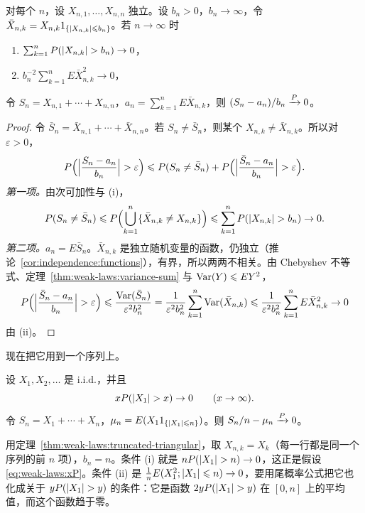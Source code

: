 \begin{theorem}[三角阵列的弱大数定律]\label{thm:weak-laws:truncated-triangular}
对每个 $n$，设 $X_{n,1},\dots,X_{n,n}$ 独立。设 $b_n>0$，$b_n\to\infty$，令 $\bar X_{n,k}=X_{n,k}1_{\{\lvert X_{n,k}\rvert\leqslant b_n\}}$。若 $n\to\infty$ 时
\begin{enumerate}
\item[(i)] $\sum_{k=1}^nP(\lvert X_{n,k}\rvert>b_n)\to0$，
\item[(ii)] $b_n^{-2}\sum_{k=1}^nE\bar X_{n,k}^2\to0$，
\end{enumerate}
令 $S_n=X_{n,1}+\cdots+X_{n,n}$，$a_n=\sum_{k=1}^nE\bar X_{n,k}$，则 $(S_n-a_n)/b_n\xrightarrow{P}0$。
\end{theorem}
\begin{proof}
令 $\bar S_n=\bar X_{n,1}+\cdots+\bar X_{n,n}$。若 $S_n\neq\bar S_n$，则某个 $X_{n,k}\neq\bar X_{n,k}$。所以对 $\varepsilon>0$，
\[
P\Bigl(\Bigl\lvert\frac{S_n-a_n}{b_n}\Bigr\rvert>\varepsilon\Bigr)\leqslant P(S_n\neq\bar S_n)+P\Bigl(\Bigl\lvert\frac{\bar S_n-a_n}{b_n}\Bigr\rvert>\varepsilon\Bigr).
\]
\emph{第一项。}由次可加性与 (i)，
\[
P(S_n\neq\bar S_n)\leqslant P\Bigl(\bigcup_{k=1}^n\{\bar X_{n,k}\neq X_{n,k}\}\Bigr)\leqslant\sum_{k=1}^nP(\lvert X_{n,k}\rvert>b_n)\to0 .
\]
\emph{第二项。}$a_n=E\bar S_n$。$\bar X_{n,k}$ 是独立随机变量的函数，仍独立（推论~\ref{cor:independence:functions}），有界，所以两两不相关。由 Chebyshev 不等式、定理~\ref{thm:weak-laws:variance-sum} 与 $\operatorname{Var}(Y)\leqslant EY^2$，
\[
P\Bigl(\Bigl\lvert\frac{\bar S_n-a_n}{b_n}\Bigr\rvert>\varepsilon\Bigr)\leqslant\frac{\operatorname{Var}(\bar S_n)}{\varepsilon^2b_n^2}=\frac1{\varepsilon^2b_n^2}\sum_{k=1}^n\operatorname{Var}(\bar X_{n,k})\leqslant\frac1{\varepsilon^2b_n^2}\sum_{k=1}^nE\bar X_{n,k}^2\to0
\]
由 (ii)。
\end{proof}

现在把它用到一个序列上。

\begin{theorem}[弱大数定律]\label{thm:weak-laws:wlln}
设 $X_1,X_2,\dots$ 是 i.i.d.，并且
\begin{equation}\label{eq:weak-laws:xP}
xP(\lvert X_1\rvert>x)\to0\qquad(x\to\infty).
\end{equation}
令 $S_n=X_1+\cdots+X_n$，$\mu_n=E(X_11_{\{\lvert X_1\rvert\leqslant n\}})$。则 $S_n/n-\mu_n\xrightarrow{P}0$。
\end{theorem}

\begin{remark}[证明思路]
用定理~\ref{thm:weak-laws:truncated-triangular}，取 $X_{n,k}=X_k$（每一行都是同一个序列的前 $n$ 项），$b_n=n$。条件 (i) 就是 $nP(\lvert X_1\rvert>n)\to0$，这正是假设 \eqref{eq:weak-laws:xP}。条件 (ii) 是 $\frac1nE(X_1^2;\lvert X_1\rvert\leqslant n)\to0$，要用尾概率公式把它也化成关于 $yP(\lvert X_1\rvert>y)$ 的条件：它是函数 $2yP(\lvert X_1\rvert>y)$ 在 $[0,n]$ 上的平均值，而这个函数趋于零。
\end{remark}

